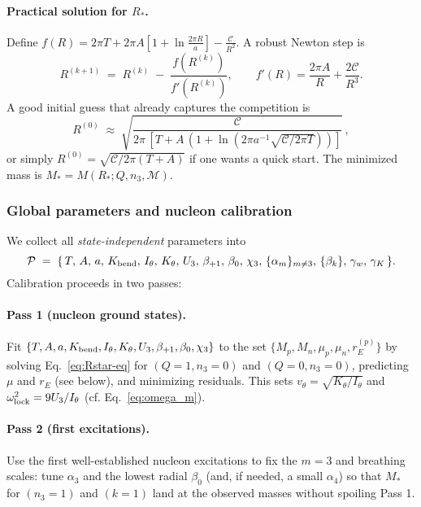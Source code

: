\paragraph{Practical solution for $R_\ast$.}
Define
$
f(R)=2\pi T + 2\pi A\!\left[1+\ln\!\frac{2\pi R}{a}\right] - \frac{\mathcal C}{R^{2}}.
$
A robust Newton step is
\begin{equation}
R^{(k+1)} \;=\; R^{(k)} \;-\; \frac{f(R^{(k)})}{f'(R^{(k)})},
\qquad
f'(R)=\frac{2\pi A}{R}+\frac{2\mathcal C}{R^{3}}.
\label{eq:newton}
\end{equation}
A good initial guess that already captures the competition is
\begin{equation}
R^{(0)} \;\approx\; \sqrt{\frac{\mathcal C}{2\pi\,[T+A\,(1+\ln(2\pi a^{-1}\sqrt{\mathcal C/2\pi T}))]}}\,,
\label{eq:R0}
\end{equation}
or simply $R^{(0)}\!=\!\sqrt{\mathcal C/2\pi(T{+}A)}$ if one wants a quick start. The minimized mass is $M_\ast=M(R_\ast;Q,n_3,\mathcal M)$.

\subsubsection{Global parameters and nucleon calibration}
\label{sec:baryons-phenomenology:calib}

We collect all \emph{state-independent} parameters into
\begin{equation}
\mathcal P \;=\; \{\,T,\,A,\,a,\,K_{\rm bend},\,I_\theta,\,K_\theta,\,U_3,\,\beta_{+1},\,\beta_0,\,\chi_3,\,\{\alpha_m\}_{m\neq 3},\,\{\beta_k\},\,\gamma_w,\,\gamma_K\,\}.
\label{eq:params}
\end{equation}
Calibration proceeds in two passes:

\paragraph{Pass 1 (nucleon ground states).}
Fit $\{T,A,a,K_{\rm bend},I_\theta,K_\theta,U_3,\beta_{+1},\beta_0,\chi_3\}$ to the set
$\{M_p,M_n,\mu_p,\mu_n,r_E^{(p)}\}$ by solving Eq.~\eqref{eq:Rstar-eq} for $(Q{=}1,n_3{=}0)$ and $(Q{=}0,n_3{=}0)$, predicting $\mu$ and $r_E$ (see below), and minimizing residuals. This sets $v_\theta=\sqrt{K_\theta/I_\theta}$ and $\omega_{\rm lock}^2=9U_3/I_\theta$ (cf. Eq.~\eqref{eq:omega_m}).

\paragraph{Pass 2 (first excitations).}
Use the first well-established nucleon excitations to fix the $m{=}3$ and breathing scales: tune $\alpha_3$ and the lowest radial $\beta_0$ (and, if needed, a small $\alpha_4$) so that $M_\ast$ for $(n_3{=}1)$ and $(k{=}1)$ land at the observed masses without spoiling Pass 1.

